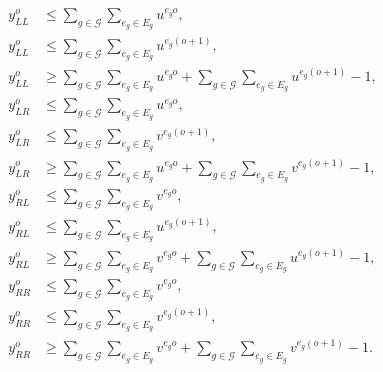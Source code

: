 \begin{align}
   y_{LL}^o &\leq \sum_{g\in\mathcal {G}} \sum_{e_g \in E_g} u^{e_g o},\label{eq:yLL-1}\\%
   y_{LL}^o &\leq \sum_{g\in\mathcal {G}} \sum_{e_g \in E_g} u^{e_g (o+1)},\\%
   y_{LL}^o &\geq \sum_{g\in\mathcal {G}} \sum_{e_g \in E_g} u^{e_g o} + \sum_{g\in\mathcal {G}} \sum_{e_g \in E_g} u^{e_g (o+1)} -1,\\%
   y_{LR}^o &\leq \sum_{g\in\mathcal {G}} \sum_{e_g \in E_g} u^{e_g o},\\%
   y_{LR}^o &\leq \sum_{g\in\mathcal {G}} \sum_{e_g \in E_g} v^{e_g (o+1)},\\%
   y_{LR}^o &\geq \sum_{g\in\mathcal {G}} \sum_{e_g \in E_g} u^{e_g o} + \sum_{g\in\mathcal {G}} \sum_{e_g \in E_g} v^{e_g (o+1)} -1,\\%
   y_{RL}^o &\leq \sum_{g\in\mathcal {G}} \sum_{e_g \in E_g} v^{e_g o},\\%
   y_{RL}^o &\leq \sum_{g\in\mathcal {G}} \sum_{e_g \in E_g} u^{e_g (o+1)},\\%
   y_{RL}^o &\geq \sum_{g\in\mathcal {G}} \sum_{e_g \in E_g} v^{e_g o} +\sum_{g\in\mathcal {G}} \sum_{e_g \in E_g} u^{e_g (o+1)} -1,\\%
   y_{RR}^o &\leq \sum_{g\in\mathcal {G}} \sum_{e_g \in E_g} v^{e_g o},\\%
   y_{RR}^o &\leq \sum_{g\in\mathcal {G}} \sum_{e_g \in E_g} v^{e_g (o+1)},\\%
   y_{RR}^o &\geq \sum_{g\in\mathcal {G}} \sum_{e_g \in E_g}v^{e_g o} +\sum_{g\in\mathcal {G}} \sum_{e_g \in E_g} v^{e_g (o+1)} -1.\label{eq:yRR-3}%
\end{align}

